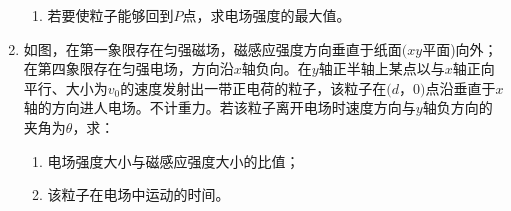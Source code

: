 \begin{enumerate}[leftmargin=0em]
\begin{enumerate}
\item 
若要使粒子能够回到$ P $点，求电场强度的最大值。

\end{enumerate}
\begin{figure}[h!]
\flushright

\end{figure}




\newpage
\item
{}
如图，在第一象限存在匀强磁场，磁感应强度方向垂直于纸面$ (xy $平面)向外；在第四象限存在匀强电场，方向沿$ x $轴负向。在$ y $轴正半轴上某点以与$ x $轴正向平行、大小为$ v_{0} $的速度发射出一带正电荷的粒子，该粒子在$ (d $，$ 0) $点沿垂直于$ x $轴的方向进人电场。不计重力。若该粒子离开电场时速度方向与$ y $轴负方向的夹角为$ \theta $，求：
\begin{enumerate}
\renewcommand{\labelenumi}{\arabic{enumi}.}
\item
电场强度大小与磁感应强度大小的比值；
\item 
该粒子在电场中运动的时间。


\end{enumerate}
\begin{figure}[h!]
\flushright

\end{figure}

\end{enumerate}
